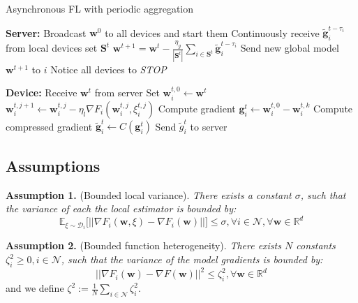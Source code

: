\documentclass{article}
\begin{document}
\begin{algorithm}
    \caption{Asynchronous FL with periodic aggregation}
    \label{alg:AFL}
    \begin{algorithmic}
    \STATE \textbf{Server:}
    \STATE Broadcast $\mathbf{w}^0$ to all devices and start them
        \STATE Continuously receive $\tilde{\mathbf{g}}_i^{t - \tau_i}$ from local devices set $\mathbf{S}^t$
        \STATE  $\mathbf{w}^{t + 1} = \mathbf{w}^{t} - \frac{\eta_g}{|\mathbf{S}^t|} \sum_{i \in \mathbf{S}^t}  \tilde{\mathbf{g}}_i^{t - \tau_i}$
        \STATE Send new global model $\mathbf{w}^{t + 1}$ to $i$
        \ENDFOR
    \ENDFOR
    \STATE Notice all devices to \textit{STOP}
    \STATE \quad
    
    \STATE \textbf{Device:}
    \STATE Receive $\mathbf{w}^t$ from server
    \STATE Set $\mathbf{w}_i^{t,0} \gets \mathbf{w}^t$
    \STATE $\mathbf{w}_i^{t,j+1} \gets \mathbf{w}_i^{t,j} - \eta_l \nabla F_i(\mathbf{w}_i^{t,j},\xi_i^{t,j})$
    \ENDFOR
    \STATE Compute gradient $\mathbf{g}_i^t \gets \mathbf{w}_i^{t,0} - \mathbf{w}_i^{t,k}$
    \STATE Compute compressed gradient $\tilde{\mathbf{g}}_i^t \gets C(\mathbf{g}_i^t)$
    \STATE Send $\tilde{g}_i^t$ to server
    \ENDWHILE
    \end{algorithmic}
\end{algorithm}

\subsection{Assumptions}

\textbf{Assumption 1.} (Bounded local variance). \textit{There exists a constant $\sigma$, such that the variance of each the local estimator is bounded by: }
\begin{equation}
    \mathbb{E}_{\xi \sim \mathcal{D}_i} \big[ ||\nabla F_i(\mathbf{w}, \xi) - \nabla F_i(\mathbf{w})||\big] \le \sigma, \forall i \in \mathcal{N}, \forall \mathbf{w} \in \mathbb{R}^d
    \label{assum:localvariacne}
\end{equation}

\textbf{Assumption 2.} (Bounded function heterogeneity). \textit{There exists $N$ constants $\zeta_i^2 \ge 0, i \in \mathcal{N}$, such that the variance of the model gradients is bounded by:}
\begin{equation}
    ||\nabla F_i(\mathbf{w}) - \nabla F(\mathbf{w})||^2 \le \zeta_i^2, \forall \mathbf{w} \in \mathbb{R}^d
    \label{assum:noniid}
\end{equation}
and we define $\zeta^2 := \frac{1}{N}\sum_{i \in \mathcal{N}} \zeta_i^2$.
\end{document}
